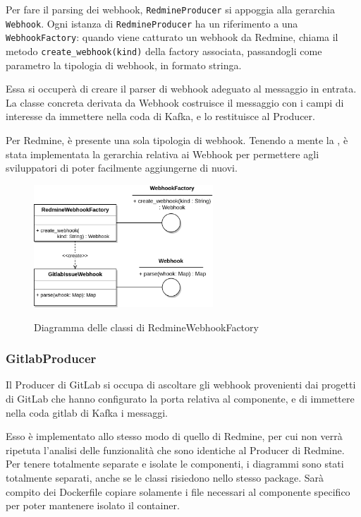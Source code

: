 Per fare il parsing dei webhook, \texttt{RedmineProducer} si appoggia alla gerarchia \texttt{Webhook}.
Ogni istanza di \texttt{RedmineProducer} ha un riferimento a una \texttt{WebhookFactory}: quando viene
catturato un webhook da Redmine, chiama il metodo \texttt{create\_webhook(kind)} della
factory associata, passandogli come parametro la tipologia di webhook, in formato stringa.

Essa si occuperà di creare il parser di webhook adeguato al messaggio in entrata.
La classe concreta derivata da Webhook costruisce il messaggio con i campi di interesse da
immettere nella coda di Kafka, e lo restituisce al Producer.

Per Redmine, è presente una sola tipologia di webhook. Tenendo a mente la ,
è stata implementata la gerarchia relativa ai Webhook per permettere agli sviluppatori di poter facilmente
aggiungerne di nuovi.

\begin{figure}[H]
    \centering
    \includegraphics[width=0.6\textwidth]{img/Producers-RedmineWebhook.png}\\
    \caption{Diagramma delle classi di RedmineWebhookFactory}
\end{figure}



\subsubsection{GitlabProducer}
Il Producer di GitLab si occupa di ascoltare gli webhook provenienti dai progetti di GitLab
che hanno configurato la porta relativa al componente, e di immettere nella coda gitlab di
Kafka i messaggi.

Esso è implementato allo stesso modo di quello di Redmine, per cui non verrà ripetuta l'analisi delle
funzionalità che sono identiche al Producer di Redmine. Per tenere totalmente separate e isolate
le componenti, i diagrammi sono stati totalmente separati, anche se le classi risiedono nello stesso package.
Sarà compito dei Dockerfile copiare solamente i file necessari al componente specifico per poter mantenere
isolato il container.


